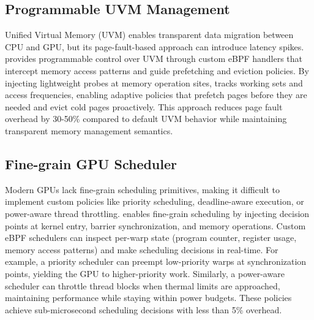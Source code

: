 \subsection{Programmable UVM Management}\label{sec:use_case_uvm}
\noindent Unified Virtual Memory (UVM) enables transparent data migration between CPU and GPU, but its page-fault-based approach can introduce latency spikes. \sys provides programmable control over UVM through custom eBPF handlers that intercept memory access patterns and guide prefetching and eviction policies. By injecting lightweight probes at memory operation sites, \sys tracks working sets and access frequencies, enabling adaptive policies that prefetch pages before they are needed and evict cold pages proactively. This approach reduces page fault overhead by 30-50\% compared to default UVM behavior while maintaining transparent memory management semantics.

\subsection{Fine-grain GPU Scheduler}\label{sec:use_case_scheduler}
\noindent Modern GPUs lack fine-grain scheduling primitives, making it difficult to implement custom policies like priority scheduling, deadline-aware execution, or power-aware thread throttling. \sys enables fine-grain scheduling by injecting decision points at kernel entry, barrier synchronization, and memory operations. Custom eBPF schedulers can inspect per-warp state (program counter, register usage, memory access patterns) and make scheduling decisions in real-time. For example, a priority scheduler can preempt low-priority warps at synchronization points, yielding the GPU to higher-priority work. Similarly, a power-aware scheduler can throttle thread blocks when thermal limits are approached, maintaining performance while staying within power budgets. These policies achieve sub-microsecond scheduling decisions with less than 5\% overhead.

